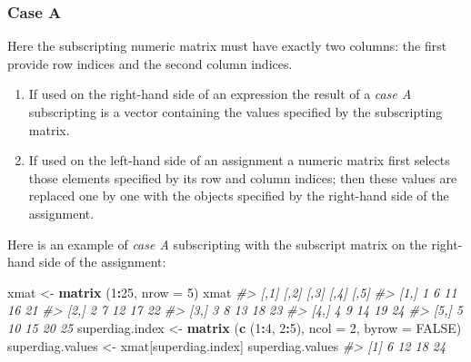 \documentclass[
]{book}
\newenvironment{Shaded}{\begin{snugshade}}{\end{snugshade}}
\newcommand{\AttributeTok}[1]{\textcolor[rgb]{0.13,0.29,0.53}{#1}}
\newcommand{\CommentTok}[1]{\textcolor[rgb]{0.56,0.35,0.01}{\textit{#1}}}
\newcommand{\ConstantTok}[1]{\textcolor[rgb]{0.56,0.35,0.01}{#1}}
\newcommand{\DecValTok}[1]{\textcolor[rgb]{0.00,0.00,0.81}{#1}}
\newcommand{\FunctionTok}[1]{\textcolor[rgb]{0.13,0.29,0.53}{\textbf{#1}}}
\newcommand{\NormalTok}[1]{#1}
\newcommand{\OtherTok}[1]{\textcolor[rgb]{0.56,0.35,0.01}{#1}}
\newcommand{\SpecialCharTok}[1]{\textcolor[rgb]{0.81,0.36,0.00}{\textbf{#1}}}
\begin{document}
\subsubsection*{Case A}\label{case-a}

Here the subscripting numeric matrix must have exactly two columns: the first provide row indices and the second column indices.

\begin{enumerate}
\def\labelenumi{(\roman{enumi})}
\item
  If used on the right-hand side of an expression the result of a \emph{case A} subscripting is a vector containing the values specified by the subscripting matrix.
\item
  If used on the left-hand side of an assignment a numeric matrix first selects those elements specified by its row and column indices; then these values are replaced one by one with the objects specified by the right-hand side of the assignment.
\end{enumerate}

Here is an example of \emph{case A} subscripting with the subscript matrix on the right-hand side of the assignment:

\begin{Shaded}
\begin{Highlighting}[]
\NormalTok{xmat }\OtherTok{\textless{}{-}} \FunctionTok{matrix}\NormalTok{ (}\DecValTok{1}\SpecialCharTok{:}\DecValTok{25}\NormalTok{, }\AttributeTok{nrow =} \DecValTok{5}\NormalTok{)}
\NormalTok{xmat}
\CommentTok{\#\textgreater{}      [,1] [,2] [,3] [,4] [,5]}
\CommentTok{\#\textgreater{} [1,]    1    6   11   16   21}
\CommentTok{\#\textgreater{} [2,]    2    7   12   17   22}
\CommentTok{\#\textgreater{} [3,]    3    8   13   18   23}
\CommentTok{\#\textgreater{} [4,]    4    9   14   19   24}
\CommentTok{\#\textgreater{} [5,]    5   10   15   20   25}
\NormalTok{superdiag.index }\OtherTok{\textless{}{-}} \FunctionTok{matrix}\NormalTok{ (}\FunctionTok{c}\NormalTok{ (}\DecValTok{1}\SpecialCharTok{:}\DecValTok{4}\NormalTok{, }\DecValTok{2}\SpecialCharTok{:}\DecValTok{5}\NormalTok{), }\AttributeTok{ncol =} \DecValTok{2}\NormalTok{, }\AttributeTok{byrow =} \ConstantTok{FALSE}\NormalTok{)}
\NormalTok{superdiag.values }\OtherTok{\textless{}{-}}\NormalTok{ xmat[superdiag.index]}
\NormalTok{superdiag.values}
\CommentTok{\#\textgreater{} [1]  6 12 18 24}
\end{Highlighting}
\end{Shaded}
\end{document}
